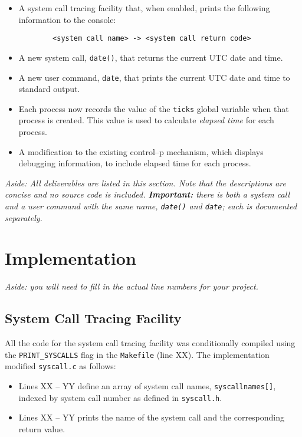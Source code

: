 \documentclass[11pt,letterpaper]{report}
\begin{document}
	\begin{itemize}
	
	\item A system call tracing facility that, when enabled, prints the following information to the console:
	\begin{verbatim}
		<system call name> -> <system call return code>
	\end{verbatim}
	
	
	\item A new system call, {\tt date()}, that returns the current UTC date and time. %
	
	\item A new user command, {\tt date}, that prints  the current UTC date and time to standard output.
	
	\item Each process now records the value of the {\tt ticks} global variable when that process is created. This value is used to calculate \emph{elapsed time} for each process.
	
	\item A modification to the existing control--p mechanism, which displays debugging information, to  include  elapsed time for each process.
	
	\end{itemize}
	
	\noindent \emph{Aside: All deliverables are listed in this section. Note that the descriptions are concise and no source code is included. \textbf{Important:} there is both a system call and a user command with the same name, {\tt date()} and {\tt date}; each is documented separately.}

\newpage	
	\section*{Implementation}
	\noindent \emph{Aside: you will need to fill in the actual line numbers for your project.}
	
	\subsection*{System Call Tracing Facility}
	All the code for the system call tracing facility was conditionally compiled using the {\tt PRINT\_SYSCALLS} flag in the {\tt Makefile} ({\color{red}line XX}). The implementation modified  {\tt syscall.c} as follows:
	\begin{itemize}

	\item {\color{red}Lines XX -- YY} define an array of system call names, {\tt syscallnames[]}, indexed by system call number as defined in {\tt syscall.h}.
	
	\item {\color{red}Lines XX -- YY} prints the name of the  system call and the corresponding return value.
	
	\end{itemize}	
	
\end{document}

